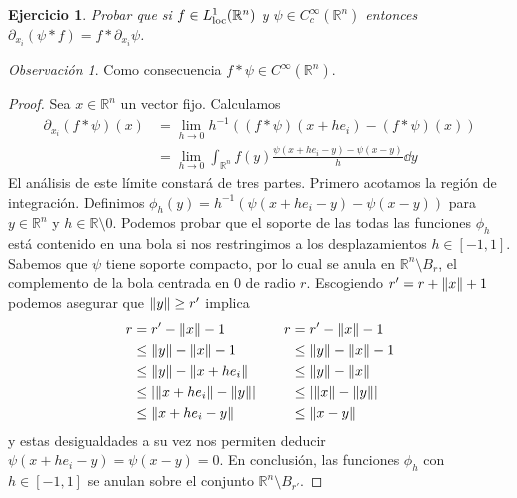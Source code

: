 \documentclass{article}
\newcommand{\realNumbers}{\mathbb{R}}
\newcommand{\locallyIntegrableFunctions}{L^1_{\textnormal{loc}}(\realNumbers^n)}
\newtheorem{exercise}{Ejercicio}
\theoremstyle{remark}
\newtheorem{remark}{Observación}
\begin{document}
  \begin{exercise}
    \label{exercise:convolutionDerivative}
    Probar que si \(f \in \locallyIntegrableFunctions\) y \(\psi \in C^{\infty}_c(\realNumbers^n)\) entonces \(\partial_{x_i} (\psi * f) = f * \partial_{x_i} \psi\).
  \end{exercise}
  \begin{remark}
    \label{remark:smoothConvolutions}
    Como consecuencia \(f * \psi \in C^{\infty}(\realNumbers^n)\).
  \end{remark}
  \begin{proof}
    Sea \(x \in \realNumbers^n\) un vector fijo.
    Calculamos
    \begin{align}
      \partial_{x_i} (f * \psi)(x)
      &=
      \lim_{h \rightarrow 0} h^{- 1} ((f * \psi)(x + h e_i) - (f * \psi)(x))
      \\
      &=
      \lim_{h \rightarrow 0}
        \int_{\realNumbers^n} f(y)  
        \frac{\psi(x + h e_i - y) - \psi(x - y)}{h}
        \dd y
    \end{align}
    El análisis de este límite constará de tres partes.
    Primero acotamos la región de integración.
    Definimos \(\phi_h(y) = h^{- 1} (\psi(x + h e_i - y) - \psi(x - y))\) para \(y \in \realNumbers^n\) y \(h \in \realNumbers \setminus 0\).
    Podemos probar que el soporte de las todas las funciones \(\phi_h\) está contenido en una bola si nos restringimos a los desplazamientos \(h \in [-1, 1]\).
    Sabemos que \(\psi\) tiene soporte compacto, por lo cual se anula en \(\realNumbers^n \setminus B_r\), el complemento de la bola centrada en 0 de radio \(r\).
    Escogiendo \(r' = r + \norm{x} + 1\) podemos asegurar que \(\norm{y} \geq r'\) implica 
    \begin{align}
      r
      &=
      r' - \norm{x} - 1
        &&& 
        r
        &=
        r' - \norm{x} - 1
      \\
      &\leq
      \norm {y} - \norm{x} - 1 
        &&&
        &\leq
        \norm{y} - \norm{x} - 1
      \\
      &\leq 
      \norm{y} - \norm{x + h e_i} 
        &&&
        &\leq
        \norm{y} - \norm{x}
      \\
      &\leq 
      \abs{\norm{x + h e_i} - \norm{y}} 
        &&&
        &\leq
        \abs{\norm{x} - \norm{y}}
      \\
      &\leq 
      \norm{x + h e_i - y}
        &&&
        &\leq
        \norm{x - y}
    \end{align}
    y estas desigualdades a su vez nos permiten deducir
    \(
      \psi(x + h e_i - y)
      =
      \psi(x - y)
      =
      0
    \).
    En conclusión, las funciones \(\phi_h\) con \(h \in [-1, 1]\) se anulan sobre el conjunto \(\realNumbers^n \setminus B_{r'}\).
    

\end{proof}
\end{document}
